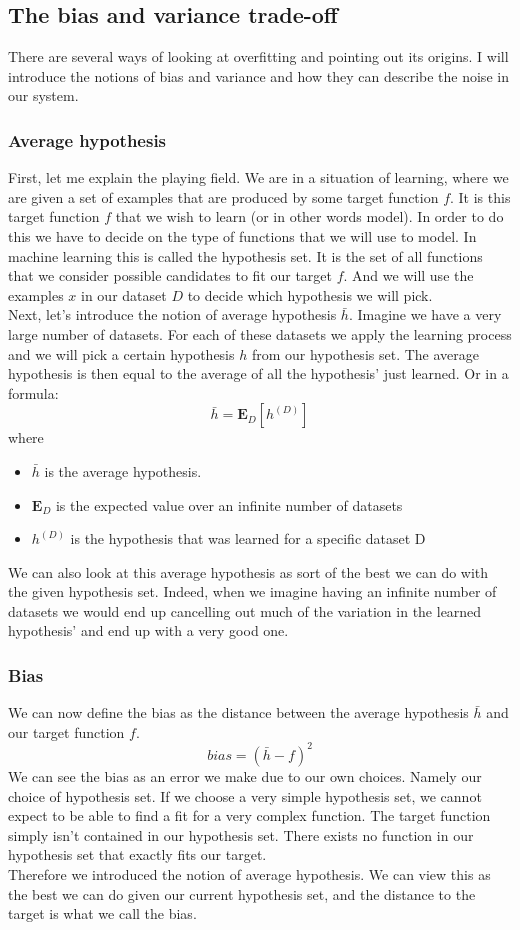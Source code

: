 \subsection{The bias and variance trade-off}
There are several ways of looking at overfitting and pointing out its origins. I will introduce the notions of bias and variance and how they can describe the noise in our system. \\
\subsubsection{Average hypothesis}
First, let me explain the playing field. We are in a situation of learning, where we are given a set of examples that are produced by some target function $f$. It is this target function $f$ that we wish to learn (or in other words model). In order to do this we have to decide on the type of functions that we will use to model. In machine learning this is called the hypothesis set. It is the set of all functions that we consider possible candidates to fit our target $f$. And we will use the examples $x$ in our dataset $D$ to decide which hypothesis we will pick. \\
Next, let's introduce the notion of average hypothesis $\bar{h}$. Imagine we have a very large number of datasets. For each of these datasets we apply the learning process and we will pick a certain hypothesis $h$ from our hypothesis set. The average hypothesis is then equal to the average of all the hypothesis' just learned. Or in a formula:
$$
\bar{h} = \mathbf{E}_{D}[h^{(D)}]
$$
where
\begin{itemize}
	\item $\bar{h}$ is the average hypothesis.
	\item $\mathbf{E}_{D}$ is the expected value over an infinite number of datasets
	\item $h^{(D)}$ is the hypothesis that was learned for a specific dataset D
\end{itemize}
We can also look at this average hypothesis as sort of the best we can do with the given hypothesis set. Indeed, when we imagine having an infinite number of datasets we would end up cancelling out much of the variation in the learned hypothesis' and end up with a very good one. \\
\subsubsection{Bias}
We can now define the bias\cite{caltechmachinelearning} as the distance between the average hypothesis $\bar{h}$ and our target function $f$.
$$
bias = (\bar{h} - f)^{2}
$$
We can see the bias as an error we make due to our own choices. Namely our choice of hypothesis set. If we choose a very simple hypothesis set, we cannot expect to be able to find a fit for a very complex function. The target function simply isn't contained in our hypothesis set. There exists no function in our hypothesis set that exactly fits our target. \\
Therefore we introduced the notion of average hypothesis. We can view this as the best we can do given our current hypothesis set, and the distance to the target is what we call the bias.
